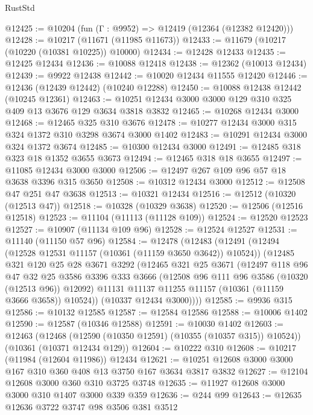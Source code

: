 \begin{lexlean}{RustStd}
\begin{coremodule}
@12425 := @10204 (fun (Γ : @9952) => @12419 (@12364 (@12382 @12420)))
@12428 := @10217 (@11671 (@11985 @11673))
@12433 := @11679 (@10217 (@10220 (@10381 @10225)) @10000)
@12434 := @12428 @12433
@12435 := @12425 @12434
@12436 := @10088 @12418
@12438 := @12362 (@10013 @12434)
@12439 := @9922 @12438
@12442 := @10020 @12434 @11555 @12420
@12446 := @12436 (@12439 @12442) (@10240 @12288)
@12450 := @10088 @12438 @12442 (@10245 @12361)
@12463 := @10251 @12434 @3000 @3000 @129 @310 @325 @409 @13 @3676 @129 @3634 @3818 @3832
@12465 := @10268 @12434 @3000
@12468 := @12465 @325 @310 @3676
@12478 := @10277 @12434 @3000 @315 @324 @1372 @310 @3298 @3674 @3000 @1402
@12483 := @10291 @12434 @3000 @324 @1372 @3674
@12485 := @10300 @12434 @3000
@12491 := @12485 @318 @323 @18 @1352 @3655 @3673
@12494 := @12465 @318 @18 @3655
@12497 := @11085 @12434 @3000 @3000
@12506 := @12497 @267 @109 @96 @57 @18 @3638 @3396 @315 @3650
@12508 := @10312 @12434 @3000
@12512 := @12508 @47 @251 @47 @3638
@12513 := @10321 @12434
@12516 := @12512 (@10320 (@12513 @47))
@12518 := @10328 (@10329 @3638)
@12520 := @12506 (@12516 @12518)
@12523 := @11104 (@11113 (@11128 @109))
@12524 := @12520 @12523
@12527 := @10907 (@11134 @109 @96)
@12528 := @12524 @12527
@12531 := @11140 (@11150 @57 @96)
@12584 := @12478
    (@12483
      (@12491
        (@12494 (@12528 @12531 @11157 (@10361 (@11159 @3650 @3642)) @10524))
        (@12485
          @321
          @120
          @25
          @28
          @3671
          @3292
          (@12465
            @321
            @25
            @3671
            (@12497
              @118
              @96
              @47
              @32
              @25
              @3586
              @3396
              @333
              @3666
              (@12508 @96 @111 @96 @3586 (@10320 (@12513 @96)) @12092)
              @11131
              @11137
              @11255
              @11157
              (@10361 (@11159 @3666 @3658))
              @10524))
          (@10337 @12434 @3000))))
@12585 := @9936 @315
@12586 := @10132 @12585
@12587 := @12584 @12586
@12588 := @10006 @1402
@12590 := @12587 (@10346 @12588)
@12591 := @10030 @1402
@12603 := @12463
    (@12468 (@12590 (@10350 @12591) (@10355 (@10357 @315)) @10524))
    (@10361 (@10371 @12434 @129))
@12604 := @10222 @310
@12608 := @10217 (@11984 (@12604 @11986)) @12434
@12621 := @10251 @12608 @3000 @3000 @167 @310 @360 @408 @13 @3750 @167 @3634 @3817 @3832
@12627 := @12104 @12608 @3000 @360 @310 @3725 @3748
@12635 := @11927 @12608 @3000 @3000 @310 @1407 @3000 @339 @359
@12636 := @244 @99
@12643 := @12635 @12636 @3722 @3747 @98 @3506 @381 @3512

\end{coremodule}
\end{lexlean}
